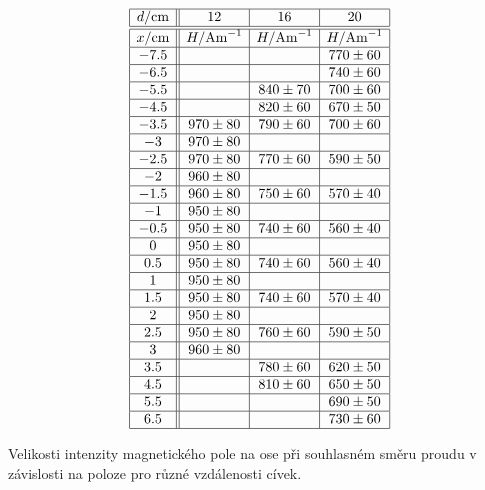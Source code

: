 \documentclass[a4paper,12pt]{article}
\begin{document}
\begin{table}
$$
\begin{array}{|c||c|c|c|}
\hline
d/\mbox{cm}&    12& 16& 20  \\ \hline \hline
x/\mbox{cm}&    H/\mbox{Am}^{-1}&   H/\mbox{Am}^{-1}&   H/\mbox{Am}^{-1} \\ \hline
-7.5&   &   &   770\pm60    \\ \hline
-6.5&   &   &   740\pm60    \\ \hline
-5.5&   &   840\pm70&   700\pm60    \\ \hline
-4.5&   &   820\pm60&   670\pm50    \\ \hline
-3.5&   970\pm80&   790\pm60&   700\pm60 \\ \hline
-3& 970\pm80&   &      \\ \hline
-2.5&   970\pm80&   770\pm60&   590\pm50 \\ \hline
-2& 960\pm80&   &      \\ \hline
-1.5&   960\pm80&   750\pm60&   570\pm40 \\ \hline
-1& 950\pm80&    &    \\ \hline
-0.5&   950\pm80&   740\pm60&   560\pm40 \\ \hline
0&  950\pm80&   &    \\ \hline
0.5&    950\pm80&   740\pm60&   560\pm40 \\ \hline
1&  950\pm80&   &    \\ \hline
1.5&    950\pm80&   740\pm60&   570\pm40 \\ \hline
2&  950\pm80&   &    \\ \hline
2.5&    950\pm80&   760\pm60&   590\pm50 \\ \hline
3&  960\pm80& &  \\ \hline
3.5&    &   780\pm60&   620\pm50 \\ \hline
4.5&    &   810\pm60&   650\pm50 \\ \hline
5.5&    &   &   690\pm50 \\ \hline
6.5&    &   &   730\pm 60 \\ \hline
\end{array}
$$
\caption{Velikosti intenzity magnetického pole na ose při souhlasném směru proudu v závislosti na poloze pro různé vzdálenosti cívek.}
\label{souhlas}
\end{table}
\end{document}
